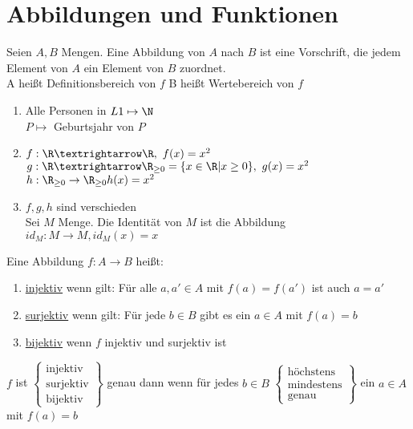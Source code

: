 %
\setcounter{chapter}{4}
\chapter{Abbildungen und Funktionen}
Seien $A, B$ Mengen. Eine Abbildung von $A$ nach $B$ ist eine Vorschrift, die jedem Element von $A$ ein Element von $B$ zuordnet.\\
%
A heißt Definitionsbereich von $f$
B heißt Wertebereich von $f$
%
\bsp
\begin{enumerate}
\item {Alle Personen in $L1 \mapsto \N$\\
$P \mapsto$ Geburtsjahr von $P$}
%
\item{$f:\R → \R, \ f(x)=x^2$\\
$g:\R→\R_{\geq 0}=\{x\in\R|x\geq 0\}, \ g(x)=x^2$\\
$h: \R_{\geq 0} \to \R_{\geq 0} h(x) = x^2$}
\bem 
\item{
$f,g,h$ sind verschieden\\
Sei $M$ Menge. Die Identität von $M$ ist die Abbildung $id_{M}:M→M, id_M(x)=x$}
\end{enumerate}
%
%
Eine Abbildung $f: A \to B$ heißt:
%
\begin{enumerate}
\item{\underline{injektiv} wenn gilt: Für alle $a, a' \in A$ mit $f(a) = f(a')$ ist auch $a = a'$}
\item{\underline{surjektiv} wenn gilt: Für jede $b\in B$ gibt es ein $a\in A$ mit $f(a)=b$}
\item{\underline{bijektiv} wenn $f$ injektiv und surjektiv ist}
\end{enumerate}
%
%
%
\bem
$f$ ist $\left\{
\begin{array}{lll}
\text{injektiv}\\
\text{surjektiv}\\
\text{bijektiv}
\end{array}
 \right\}$ genau dann wenn für jedes $b \in B$ $\left\{\begin{array}{llll} \text{höchstens}\\ \text{mindestens}\\ \text{genau} \end{array} \right\}$ ein $a \in A$ mit $f(a) = b$\\
